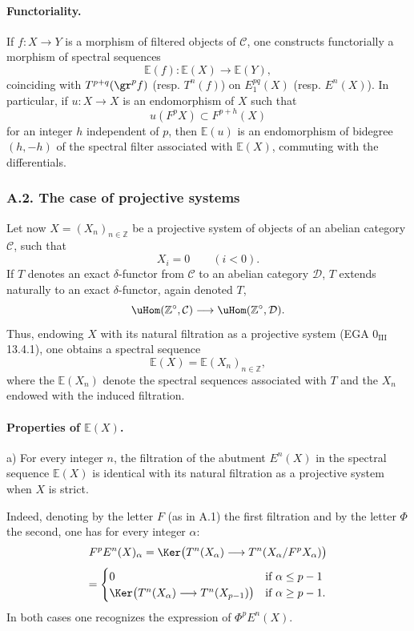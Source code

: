 \paragraph{Functoriality.}
If \(f:X\to Y\) is a morphism of filtered objects of \(\mathcal C\), one constructs functorially a morphism of spectral sequences
\[
\mathbb{E}(f):\mathbb{E}(X)\longrightarrow \mathbb{E}(Y),
\]
coinciding with \(T^{p+q}(\gr^p f)\) (resp. \(T^n(f)\)) on \(E_1^{pq}(X)\) (resp. \(E^n(X)\)). In particular, if \(u:X\to X\) is an endomorphism of \(X\) such that
\[
u(F^pX)\subset F^{p+h}(X)
\]
for an integer \(h\) independent of \(p\), then \(\mathbb{E}(u)\) is an endomorphism of bidegree \((h,-h)\) of the spectral filter associated with \(\mathbb{E}(X)\), commuting with the differentials.

\subsubsection*{A.2. The case of projective systems}
Let now \(X=(X_n)_{n\in\mathbb Z}\) be a projective system of objects of an abelian category \(\mathcal C\), such that
\[
X_i=0\qquad(i<0).
\]
If \(T\) denotes an exact \(\delta\)-functor from \(\mathcal C\) to an abelian category \(\mathcal D\), \(T\) extends naturally to an exact \(\delta\)-functor, again denoted \(T\),
\[
\uHom(\mathbb Z^\circ,\mathcal C)\longrightarrow \uHom(\mathbb Z^\circ,\mathcal D).
\]
Thus, endowing \(X\) with its natural filtration as a projective system (EGA \(0_{\mathrm{III}}\) 13.4.1), one obtains a spectral sequence
\[
\mathbb{E}(X)=\mathbb{E}(X_n)_{n\in\mathbb Z},
\]
where the \(\mathbb{E}(X_n)\) denote the spectral sequences associated with \(T\) and the \(X_n\) endowed with the induced filtration.

\paragraph{Properties of \(\mathbb{E}(X)\).}
a) For every integer \(n\), the filtration of the abutment \(E^n(X)\) in the spectral sequence \(\mathbb{E}(X)\) is identical with its natural filtration as a projective system when \(X\) is strict.

Indeed, denoting by the letter \(F\) (as in A.1) the first filtration and by the letter \(\Phi\) the second, one has for every integer \(\alpha\):
\[
F^pE^n(X)_\alpha
=\Ker\bigl(T^n(X_\alpha)\longrightarrow T^n(X_\alpha/F^pX_\alpha)\bigr)
\]
\[
=
\begin{cases}
0 & \text{if } \alpha\le p-1\\
\Ker\bigl(T^n(X_\alpha)\longrightarrow T^n(X_{p-1})\bigr) & \text{if } \alpha\ge p-1.
\end{cases}
\]
In both cases one recognizes the expression of \(\Phi^pE^n(X)\).

